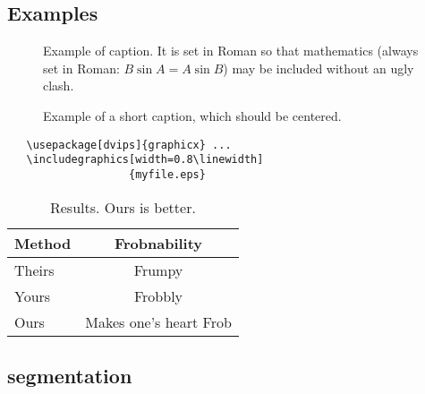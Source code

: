 \subsection{Examples}

\begin{figure}[t]
\begin{center}
\fbox{\rule{0pt}{2in} \rule{0.9\linewidth}{0pt}}
\end{center}
   \caption{Example of caption.  It is set in Roman so that mathematics
   (always set in Roman: $B \sin A = A \sin B$) may be included without an
   ugly clash.}
\label{fig:long}
\label{fig:onecol}
\end{figure}


\begin{figure*}
\begin{center}
\fbox{\rule{0pt}{2in} \rule{.9\linewidth}{0pt}}
\end{center}
   \caption{Example of a short caption, which should be centered.}
\label{fig:short}
\end{figure*}


{\small\begin{verbatim}
   \usepackage[dvips]{graphicx} ...
   \includegraphics[width=0.8\linewidth]
                   {myfile.eps}
\end{verbatim}
}

\begin{table}
\begin{center}
\begin{tabular}{|l|c|}
\hline
Method & Frobnability \\
\hline\hline
Theirs & Frumpy \\
Yours & Frobbly \\
Ours & Makes one's heart Frob\\
\hline
\end{tabular}
\end{center}
\caption{Results.   Ours is better.}
\end{table}


\subsection{segmentation}

